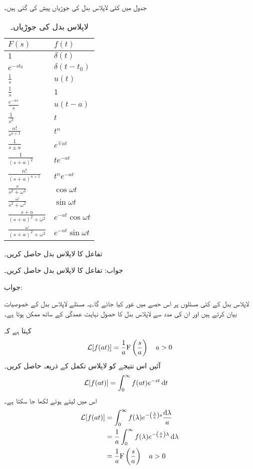 جدول  میں کئی لاپلاس بدل کی جوڑیاں پیش کی گئی ہیں۔
\begin{table}
\caption{لاپلاس بدل کی جوڑیاں۔}
\label{جدول_لاپلاس_بدل_جوڑیاں}
\centering
\begin{tabular}{l l}
$F(s)$&$f(t)$\\[2ex] 
\hline 
$1$&$\delta(t)$ \\[2ex] 
$e^{-s t_0}$&$\delta(t-t_0)$ \\[2ex] 
$\frac{1}{s}$&$u(t)$ \\[2ex] 
$\frac{1}{s}$&$1$ \\[2ex] 
$\frac{e^{-as}}{s}$&$u(t-a)$ \\[2ex] 
$\frac{1}{s^2}$&$t$ \\[2ex] 
$\frac{n!}{s^{n+1}}$&$t^n$ \\[2ex] 
$\frac{1}{s\pm a}$&$e^{\mp at}$ \\[2ex] 
$\frac{1}{(s+a)^2}$&$te^{-at}$ \\[2ex] 
$\frac{n!}{(s+a)^{n+1}}$&$t^n e^{-at}$ \\[2ex] 
$\frac{s}{s^2+\omega^2}$&$\cos \omega t$ \\[2ex] 
$\frac{\omega}{s^2+\omega^2}$&$\sin \omega t$ \\[2ex] 
$\frac{s+a}{(s+a)^2+\omega^2}$&$e^{-at} \cos \omega t$ \\[2ex] 
$\frac{\omega}{(s+a)^2+\omega^2}$&$e^{-at} \sin \omega t$ 
\end{tabular}
\end{table}

تفاعل  کا لاپلاس بدل حاصل کریں۔

جواب:
تفاعل  کا لاپلاس بدل حاصل کریں۔

جواب:

لاپلاس بدل کے کئی مسئلوں پر اس حصے میں غور کیا جائے گا۔یہ مسئلے لاپلاس بدل کے خصوصیات بیان کرتے ہیں اور ان کی مدد سے لاپلاس بدل کا حصول نہایت عمدگی کے ساتھ ممکن ہوتا ہے۔

 کہتا ہے کہ
\begin{align}
\mathcal{L}[f(at)]=\frac{1}{a} {{\textup{F}}}\left(\frac{s}{a}\right) \quad a>0
\end{align}
آئیں اس نتیجے کو لاپلاس تکمل کے ذریعہ حاصل کریں۔
\begin{align*}
\Laplace[f(at)]&=\int_0^{\infty} f(at) e^{-st} \dif t
\end{align*}
اس میں  لیتے ہوئے  لکھا جا سکتا ہے۔
\begin{align*}
\Laplace[f(at)]&=\int_0^{\infty} f(\lambda) e^{-\left(\frac{\lambda}{a}\right)s} \frac{\dif \lambda}{a}\\
&=\frac{1}{a}\int_0^{\infty} f(\lambda) e^{-\left(\frac{s}{a}\right)\lambda } \dif \lambda\\
&=\frac{1}{a} \bF\left(\frac{s}{a}\right) \quad a>0
\end{align*}

